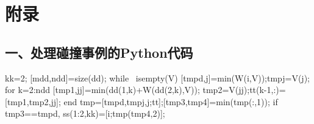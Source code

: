\chapter{附录}

\section*{一、处理碰撞事例的Python代码}
\begin{jllisting}[language={python}, caption={一段python源代码}, label=code:2]
kk=2;
[mdd,ndd]=size(dd);
while ~isempty(V)
    [tmpd,j]=min(W(i,V));tmpj=V(j);
for k=2:ndd
    [tmp1,jj]=min(dd(1,k)+W(dd(2,k),V));
    tmp2=V(jj);tt(k-1,:)=[tmp1,tmp2,jj];
end
    tmp=[tmpd,tmpj,j;tt];[tmp3,tmp4]=min(tmp(:,1));
if tmp3==tmpd, ss(1:2,kk)=[i;tmp(tmp4,2)];
 \end{jllisting}
 
 \newpage
 
